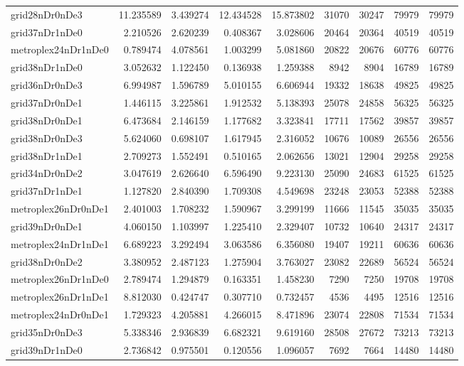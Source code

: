 \begin{longtable}{|l|r|r|r|r|r|r|r|r|}
grid28nDr0nDe3 & 11.235589 & 3.439274 & 12.434528 & 15.873802 & 31070 & 30247 & 79979 & 79979 \\
grid37nDr1nDe0 & 2.210526 & 2.620239 & 0.408367 & 3.028606 & 20464 & 20364 & 40519 & 40519 \\
metroplex24nDr1nDe0 & 0.789474 & 4.078561 & 1.003299 & 5.081860 & 20822 & 20676 & 60776 & 60776 \\
grid38nDr1nDe0 & 3.052632 & 1.122450 & 0.136938 & 1.259388 & 8942 & 8904 & 16789 & 16789 \\
grid36nDr0nDe3 & 6.994987 & 1.596789 & 5.010155 & 6.606944 & 19332 & 18638 & 49825 & 49825 \\
grid37nDr0nDe1 & 1.446115 & 3.225861 & 1.912532 & 5.138393 & 25078 & 24858 & 56325 & 56325 \\
grid38nDr0nDe1 & 6.473684 & 2.146159 & 1.177682 & 3.323841 & 17711 & 17562 & 39857 & 39857 \\
grid38nDr0nDe3 & 5.624060 & 0.698107 & 1.617945 & 2.316052 & 10676 & 10089 & 26556 & 26556 \\
grid38nDr1nDe1 & 2.709273 & 1.552491 & 0.510165 & 2.062656 & 13021 & 12904 & 29258 & 29258 \\
grid34nDr0nDe2 & 3.047619 & 2.626640 & 6.596490 & 9.223130 & 25090 & 24683 & 61525 & 61525 \\
grid37nDr1nDe1 & 1.127820 & 2.840390 & 1.709308 & 4.549698 & 23248 & 23053 & 52388 & 52388 \\
metroplex26nDr0nDe1 & 2.401003 & 1.708232 & 1.590967 & 3.299199 & 11666 & 11545 & 35035 & 35035 \\
grid39nDr0nDe1 & 4.060150 & 1.103997 & 1.225410 & 2.329407 & 10732 & 10640 & 24317 & 24317 \\
metroplex24nDr1nDe1 & 6.689223 & 3.292494 & 3.063586 & 6.356080 & 19407 & 19211 & 60636 & 60636 \\
grid38nDr0nDe2 & 3.380952 & 2.487123 & 1.275904 & 3.763027 & 23082 & 22689 & 56524 & 56524 \\
metroplex26nDr1nDe0 & 2.789474 & 1.294879 & 0.163351 & 1.458230 & 7290 & 7250 & 19708 & 19708 \\
metroplex26nDr1nDe1 & 8.812030 & 0.424747 & 0.307710 & 0.732457 & 4536 & 4495 & 12516 & 12516 \\
metroplex24nDr0nDe1 & 1.729323 & 4.205881 & 4.266015 & 8.471896 & 23074 & 22808 & 71534 & 71534 \\
grid35nDr0nDe3 & 5.338346 & 2.936839 & 6.682321 & 9.619160 & 28508 & 27672 & 73213 & 73213 \\
grid39nDr1nDe0 & 2.736842 & 0.975501 & 0.120556 & 1.096057 & 7692 & 7664 & 14480 & 14480 \\

\end{longtable}
